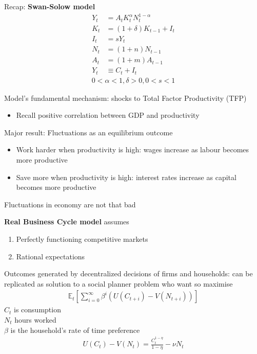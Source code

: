 \documentclass{beamer}
\begin{document}
\begin{frame}
  Recap: \textbf{Swan-Solow model}
  \begin{align}
    Y_t &= A_tK_t^{\alpha}N_t^{1-\alpha}\\
    K_t &= (1+\delta)K_{t-1} + I_t\\
    I_t &= sY_t\\
    N_t &= (1+n)N_{t-1}\\
    A_t &= (1+m)A_{t-1}\\
    Y_t &\equiv C_t + I_t
  \end{align}
  \begin{align*}
    0<\alpha<1, \delta>0, 0<s<1
  \end{align*}
\end{frame}

\begin{frame}
  Model's fundamental mechanism: shocks to Total Factor Productivity (TFP)
  \begin{itemize}
    \item Recall positive correlation between GDP and productivity
  \end{itemize}
  \medskip
  Major result: Fluctuations as an equilibrium outcome
  \begin{itemize}
    \item Work harder when productivity is high: wages increase as labour becomes more productive
    \item Save more when productivity is high: interest rates increase as capital becomes more productive
  \end{itemize}
  \medskip
  Fluctuations in economy are not that bad
\end{frame}


\begin{frame}
  \textbf{Real Business Cycle model} assumes
  \begin{enumerate}
    \item Perfectly functioning competitive markets
    \item Rational expectations
  \end{enumerate}
  \medskip
  Outcomes generated by decentralized decisions of firms and households: can be replicated as solution to a social planner problem who want so maximise
 \begin{align}
  \mathbb{E}_t \left[\sum^{\infty}_{i=0} \beta^i(U(C_{t+i})-V(N_{t+i})) \right]
 \end{align}
 $C_t$ is consumption\\
 $N_t$ hours worked\\
 $\beta$ is the household's rate of time preference 
\begin{align}
  U(C_t)-V(N_t)=\frac{C_t^{1-\eta}}{1-\eta}-\nu N_t
\end{align}
\end{frame}
\end{document}

